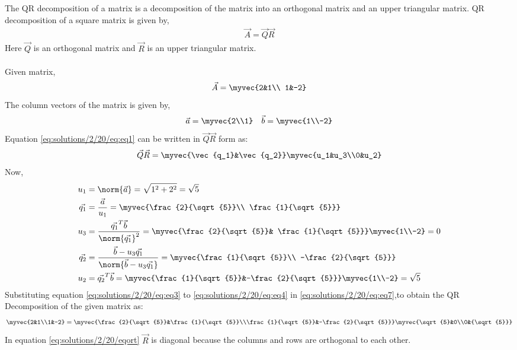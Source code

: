 The QR decomposition  of a matrix is a decomposition of the matrix into an orthogonal matrix and an upper triangular matrix.
QR decomposition of a square matrix is given by,
\begin{align}
    \vec{A} = \vec{Q}\vec{R}
\end{align}
Here  $\vec{Q}$ is an orthogonal matrix and $\vec{R}$ is an upper triangular matrix.\\
\\
Given matrix,
\begin{align}
    \vec{A} = 
    \myvec{2&1\\
    1&-2} \label{eq:solutions/2/20/eq:eq1}
\end{align}
The column vectors of the matrix is given by,
\begin{align}
    \vec{a}=\myvec{2\\1} \quad \vec{b}=\myvec{1\\-2} \label{eq:solutions/2/20/eq:eq2}
\end{align}
Equation \eqref{eq:solutions/2/20/eq:eq1} can be written in $\vec{Q}\vec{R}$ form as:
\begin{align}
    \vec{Q}\vec{R} = \myvec{\vec{q_1}&\vec{q_2}} \myvec{u_1&u_3\\0&u_2}  \label{eq:solutions/2/20/eq:eq7}
\end{align}
Now, 
\begin{align}
u_1 &= \norm{\vec{a}} = \sqrt{1^2+2^2} = \sqrt{5}\label{eq:solutions/2/20/eq:eq3}\\
\vec{q_1} &= \frac{\vec{a}}{u_1} = \myvec{\frac{2}{\sqrt{5}}\\ \frac{1}{\sqrt{5}}}\\
u_3 &= \frac{\vec{q_1}^T\vec{b}}{\norm{\vec{q_1}}^2} = \myvec{\frac{2}{\sqrt{5}}& \frac{1}{\sqrt{5}}}\myvec{1\\-2} = 0\\
\vec{q_2} &= \frac{\vec{b} - u_3 \vec{q_1}}{\norm{\vec{b} - u_3 \vec{q_1}}} = \myvec{\frac{1}{\sqrt{5}}\\ -\frac{2}{\sqrt{5}}}\\
u_2 &= {\vec{q_2}^T\vec{b}} = \myvec{\frac{1}{\sqrt{5}}&-\frac{2}{\sqrt{5}}}\myvec{1\\-2}=\sqrt{5}\label{eq:solutions/2/20/eq:eq4}
\end{align}
Substituting equation \eqref{eq:solutions/2/20/eq:eq3} to \eqref{eq:solutions/2/20/eq:eq4} in \eqref{eq:solutions/2/20/eq:eq7},to obtain
the QR Decomposition of the given matrix as:
\begin{align}\label{eq:solutions/2/20/eqort}
    \myvec{2&1\\1&-2} = \myvec{\frac{2}{\sqrt{5}}&\frac{1}{\sqrt{5}}\\\frac{1}{\sqrt{5}}&-\frac{2}{\sqrt{5}}}\myvec{\sqrt{5}&0\\0&{\sqrt{5}}}
\end{align}
In equation \eqref{eq:solutions/2/20/eqort} $\vec R$ is diagonal because the columns and rows are orthogonal to each other.

 

